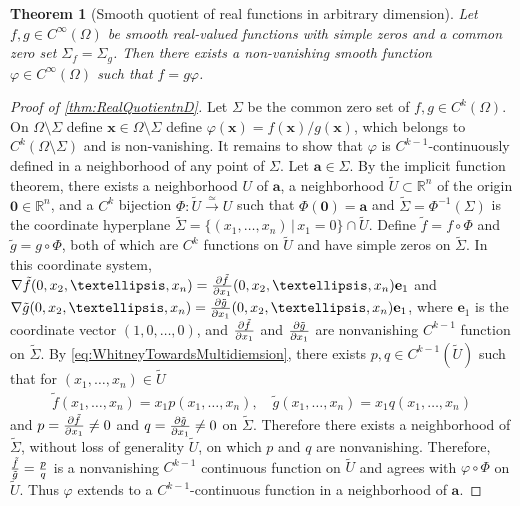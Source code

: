 \documentclass[10pt,a4paper]{amsart}
\newtheorem{theorem}{Theorem}
\def\RR{\mathbb{R}}
\def\ba{\mathbf{a}}
\def\be{\mathbf{e}}
\def\bx{\mathbf{x}}
\def\bzero{\mathbf{0}}
\begin{document}
\begin{theorem}[Smooth quotient of real functions in arbitrary dimension]
\label{thm:RealQuotientnD}
    Let \(f,g\in C^\infty(\Omega)\) be smooth real-valued functions with simple zeros and a common zero set \(\Sigma_{f} = \Sigma_{g}\).  Then there exists a non-vanishing smooth function \(\varphi\in C^\infty(\Omega)\) such that \(f = g\varphi\).
\end{theorem}

\begin{proof}[Proof of \autoref{thm:RealQuotientnD}]
    Let \(\Sigma\) be the common zero set of \(f,g\in C^k(\Omega)\).  On \(\Omega\setminus\Sigma\) define \(\bx\in\Omega\setminus\Sigma\) define \(\varphi(\bx) = f(\bx)/g(\bx)\), which belongs to \(C^{k}(\Omega\setminus\Sigma)\) and is non-vanishing.
    It remains to show that \(\varphi\) is \(C^{k-1}\)-continuously defined in a neighborhood of any point of \(\Sigma\).  Let \(\ba\in\Sigma\).  By the implicit function theorem, there exists a neighborhood \(U\) of \(\ba\), a neighborhood \(\tilde U\subset\RR^n\) of the origin \(\bzero\in\RR^n\), and a \(C^k\) bijection \(\Phi\colon \tilde U\xrightarrow{\simeq} U\) such that \(\Phi(\bzero) = \ba\) and \(\tilde\Sigma = \Phi^{-1}(\Sigma)\) is the coordinate hyperplane \(\tilde\Sigma = \{(x_1,\ldots, x_n)\,|\,x_1 = 0\}\cap\tilde U\).
    Define \(\tilde f = f\circ\Phi\) and \(\tilde g = g\circ\Phi\), both of which are \(C^k\) functions on \(\tilde U\) and have simple zeros on \(\tilde\Sigma\).  
    In this coordinate system, \(\nabla \tilde f(0,x_2,\ldots,x_n) = {\partial \tilde f\over\partial x_1}(0,x_2,\ldots,x_n)\be_1\) and \(\nabla \tilde g(0,x_2,\ldots,x_n) = {\partial \tilde g\over\partial x_1}(0,x_2,\ldots,x_n)\be_1\), where \(\be_1\) is the coordinate vector \((1,0,\ldots,0)\), and \({\partial\tilde f\over\partial x_1}\) and \({\partial\tilde g\over\partial x_1}\) are nonvanishing \(C^{k-1}\) function on \(\tilde\Sigma\).
    By \eqref{eq:WhitneyTowardsMultidiemsion}, there exists \(p,q\in C^{k-1}(\tilde U)\) such that for \((x_1,\ldots,x_n)\in \tilde U\)
    \begin{align*}
        \tilde f(x_1,\ldots,x_n) = x_1 p(x_1,\ldots,x_n),\quad\tilde g(x_1,\ldots,x_n) = x_1q(x_1,\ldots,x_n)
    \end{align*}
    and \(p = {\partial\tilde f\over\partial x_1}\neq 0\) and \(q = {\partial\tilde g\over\partial x_1}\neq 0\) on \(\tilde\Sigma\).
    Therefore there exists a neighborhood of \(\tilde\Sigma\), without loss of generality \(\tilde U\), on which \(p\) and \(q\) are nonvanishing.  Therefore, \({\tilde f\over\tilde g} = {p\over q}\) is a nonvanishing \(C^{k-1}\) continuous function on \(\tilde U\) and agrees with \(\varphi\circ \Phi\) on \(\tilde U\).  Thus \(\varphi\) extends to a \(C^{k-1}\)-continuous function in a neighborhood of \(\ba\).
\end{proof}
\end{document}
